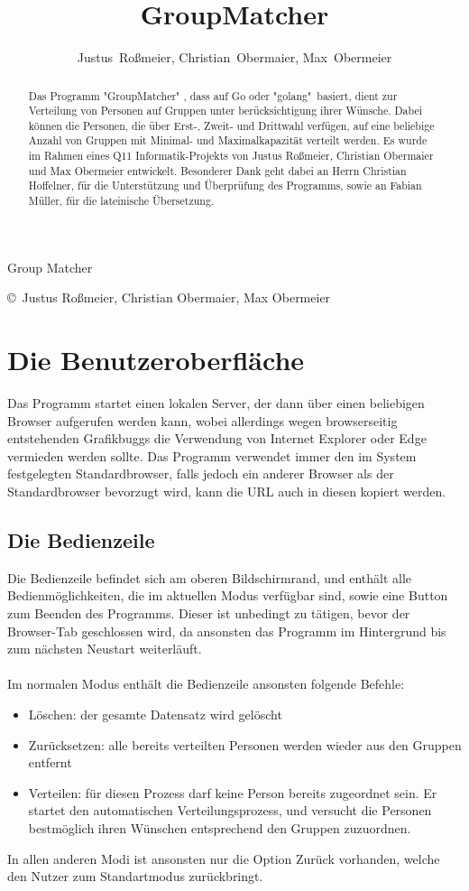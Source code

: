 \documentclass[a4paper,11pt]{article}
\author{Justus~Roßmeier,
Christian~Obermaier,
Max~Obermeier}
\title{GroupMatcher}
\begin{document}
\begin{center}
\begin{Huge}
Group Matcher \\
\end{Huge}
\vspace{10pt}
\copyright\ Justus Roßmeier,
Christian Obermaier,
Max Obermeier \\
\begin{abstract}
\label{sec:introduction}
Das Programm "GroupMatcher" , dass auf Go oder "golang"\ basiert, dient zur Verteilung von Personen auf Gruppen unter berücksichtigung ihrer Wünsche.
Dabei können die Personen, die über Erst-, Zweit- und Drittwahl verfügen, auf eine beliebige Anzahl von Gruppen mit Minimal- und Maximalkapazität verteilt werden. Es wurde im Rahmen eines Q11 Informatik-Projekts von Justus Roßmeier, Christian Obermaier und Max Obermeier entwickelt. Besonderer Dank geht dabei an Herrn Christian Hoffelner, für die Unterstützung und Überprüfung des Programms, sowie an Fabian Müller, für die lateinische Übersetzung.
\end{abstract}
\end{center}
\tableofcontents
\section{Die Benutzeroberfläche}
\label{sec:user-interface}
Das Programm startet einen lokalen Server, der dann über einen beliebigen Browser aufgerufen werden kann, wobei allerdings wegen browserseitig entstehenden Grafikbuggs die Verwendung von Internet Explorer oder Edge vermieden werden sollte. Das Programm verwendet immer den im System festgelegten Standardbrowser, falls jedoch ein anderer Browser als der Standardbrowser bevorzugt wird, kann die URL auch in diesen kopiert werden. 

\subsection{Die Bedienzeile}
\label{ssec:top-bar}
Die Bedienzeile befindet sich am oberen Bildschirmrand, und enthält alle Bedienmöglichkeiten, die im aktuellen Modus verfügbar sind, sowie eine Button zum Beenden des Programms. Dieser ist unbedingt zu tätigen, bevor der Browser-Tab geschlossen wird, da ansonsten das Programm im Hintergrund bis zum nächsten Neustart weiterläuft. \\ \\
Im normalen Modus enthält die Bedienzeile ansonsten folgende Befehle:
\begin{itemize}
    \item Löschen: der gesamte Datensatz wird gelöscht
    \item Zurücksetzen: alle bereits verteilten Personen werden wieder aus den Gruppen entfernt
    \item Verteilen: für diesen Prozess darf keine Person bereits zugeordnet sein. Er startet den automatischen Verteilungsprozess, und versucht die Personen bestmöglich ihren Wünschen entsprechend den Gruppen zuzuordnen.
\end{itemize}
In allen anderen Modi ist ansonsten nur die Option Zurück vorhanden, welche den Nutzer zum Standartmodus zurückbringt.
\end{document}
